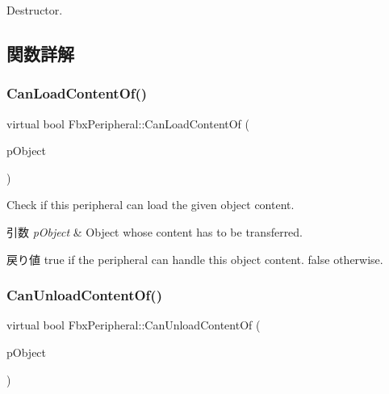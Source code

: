Destructor. 



\subsection{関数詳解}
\mbox{\label{class_fbx_peripheral_a2cd1f044d656a2a8a40d86df3725b496}} 
\subsubsection{\texorpdfstring{Can\+Load\+Content\+Of()}{CanLoadContentOf()}}
{\footnotesize\ttfamily virtual bool Fbx\+Peripheral\+::\+Can\+Load\+Content\+Of (\begin{DoxyParamCaption}\item[{\hyperlink{class_fbx_object}{Fbx\+Object} $\ast$}]{p\+Object }\end{DoxyParamCaption})\hspace{0.3cm}{\ttfamily [pure virtual]}}

Check if this peripheral can load the given object content. 
\begin{DoxyParams}{引数}
{\em p\+Object} & Object whose content has to be transferred. \\
\hline
\end{DoxyParams}
\begin{DoxyReturn}{戻り値}
{\ttfamily true} if the peripheral can handle this object content. {\ttfamily false} otherwise. 
\end{DoxyReturn}
\mbox{\label{class_fbx_peripheral_ac1d217526c6b5de7f621ab7c5151f69e}} 
\subsubsection{\texorpdfstring{Can\+Unload\+Content\+Of()}{CanUnloadContentOf()}}
{\footnotesize\ttfamily virtual bool Fbx\+Peripheral\+::\+Can\+Unload\+Content\+Of (\begin{DoxyParamCaption}\item[{\hyperlink{class_fbx_object}{Fbx\+Object} $\ast$}]{p\+Object }\end{DoxyParamCaption})\hspace{0.3cm}{\ttfamily [pure virtual]}}

